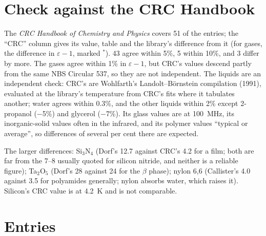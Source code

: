 \documentclass[10pt]{article}
\begin{document}
\section*{Check against the CRC Handbook}

The \emph{CRC Handbook of Chemistry and Physics} \cite{crcstat} covers 51 of the entries; the ``CRC'' column gives its value, table and the library's difference from it (for gases, the difference in $\varepsilon-1$, marked $^*$). 43 agree within 5\%, 5 within 10\%, and 3 differ by more. The gases agree within 1\% in $\varepsilon-1$, but CRC's values descend partly from the same NBS Circular 537, so they are not independent. The liquids are an independent check: CRC's are Wohlfarth's Landolt--B\"ornstein compilation (1991), evaluated at the library's temperature from CRC's fits where it tabulates another; water agrees within 0.3\%, and the other liquids within 2\% except 2-propanol ($-$5\%) and glycerol ($-$7\%). Its glass values are at 100~MHz, its inorganic-solid values often in the infrared, and its polymer values ``typical or average'', so differences of several per cent there are expected.

The larger differences: Si$_3$N$_4$ (Dorf's 12.7 against CRC's 4.2 for a film; both are far from the 7--8 usually quoted for silicon nitride, and neither is a reliable figure); Ta$_2$O$_5$ (Dorf's 28 against 24 for the $\beta$ phase); nylon 6,6 (Callister's 4.0 against 3.5 for polyamides generally; nylon absorbs water, which raises it). Silicon's CRC value is at 4.2~K and is not comparable.

\section*{Entries}
\end{document}
